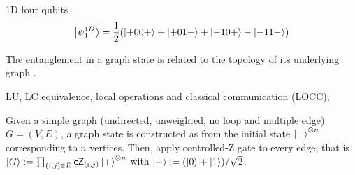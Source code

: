 \begin{definition}\label{def:cluster_state}
	1D four qubits
	\begin{equation}
		\ket{\psi_4^{1D}} = \frac{1}{2} \qty(
			\ket{+00+} + \ket{+01-} + \ket{-10+} - \ket{-11-}
		)
	\end{equation}
\end{definition}
	The entanglement in a graph state is related to the topology of its underlying graph \cite{heinEntanglementGraphStates2006}.
\begin{remark}
	LU, LC equivalence, local operations and classical communication (LOCC), 
\end{remark}
\begin{definition}\label{def:graph_state}
	Given a simple graph (undirected, unweighted, no loop and multiple edge) $G=(V,E)$, a graph state is constructed as 
	from the initial state $\ket{+}^{\otimes n}$ corresponding to $n$ vertices.
	Then, apply controlled-Z gate to every edge, that is 
	$\ket{G}:=\prod_{(i,j)\in E}\textsf{cZ}_{(i,j)} \ket{+}^{\otimes n}$
	with $\ket{+}: = (\ket{0}+\ket{1})/\sqrt{2}$.
\end{definition}

